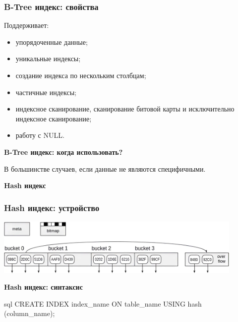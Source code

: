 \documentclass[aspectratio=169]{beamer}
\begin{document}
\begin{frame}
  \frametitle{B-Tree индекс: свойства}

  Поддерживает:
  \begin{itemize}
    \item упорядоченные данные;
    \item уникальные индексы;
    \item создание индекса по нескольким столбцам;
    \item частичные индексы;
    \item индексное сканирование, сканирование битовой карты и исключительно
    индексное сканирование;
    \item работу с NULL.
  \end{itemize}
\end{frame}


\begin{frame}
  \vspace*{1em}
  \begin{center}
    {\LARGE \textbf{B-Tree индекс: когда использовать?}}

    \vspace*{1em}

    В большинстве случаев, если данные не являются специфичными.
  \end{center}
\end{frame}

\begin{frame}
  \vspace*{1em}
  \begin{center}
    {\huge \textbf{Hash индекс}}
  \end{center}
\end{frame}

\begin{frame}
  \frametitle{Hash индекс: устройство}

  \centering
  \includegraphics[width=0.9\textwidth]{images/hash/buckets.png}
\end{frame}

\begin{frame}[fragile]
  \begin{center}
    {\Large \textbf{Hash индекс: синтаксис}}

    \vspace*{1em}

    \begin{cminted}{sql}
      CREATE INDEX index_name ON table_name USING hash (column_name);
    \end{cminted}
  \end{center}
\end{frame}
\end{document}
